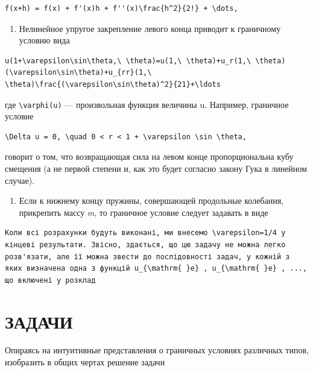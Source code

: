 \documentclass[
  ukrainian,
]{article}
\providecommand{\tightlist}{%
  \setlength{\itemsep}{0pt}\setlength{\parskip}{0pt}}
\begin{document}
\begin{verbatim}
f(x+h) = f(x) + f'(x)h + f''(x)\frac{h^2}{2!} + \dots,
\end{verbatim}

\begin{enumerate}
\def\labelenumi{\arabic{enumi}.}
\setcounter{enumi}{1}
\tightlist
\item
  Нелинейное упругое закрепление левого конца приводит к граничному
  условию вида
\end{enumerate}

\begin{verbatim}
u(1+\varepsilon\sin\theta,\ \theta)=u(1,\ \theta)+u_r(1,\ \theta)(\varepsilon\sin\theta)+u_{rr}(1,\ \theta)\frac{(\varepsilon\sin\theta)^2}{21}+\ldots
\end{verbatim}

где \texttt{\textbackslash{}varphi(u)} --- произвольная функция величины
u. Например, граничное условие

\begin{verbatim}
\Delta u = 0, \quad 0 < r < 1 + \varepsilon \sin \theta,
\end{verbatim}

говорит о том, что возвращающая сила на левом конце пропорциональна кубу
смещения (а не первой степени и, как это будет согласно закону Гука в
линейном случае).

\begin{enumerate}
\def\labelenumi{\arabic{enumi}.}
\setcounter{enumi}{2}
\tightlist
\item
  Если к нижнему концу пружины, совершающей продольные колебания,
  прикрепить массу \emph{m}, то граничное условие следует задавать в
  виде
\end{enumerate}

\begin{verbatim}
Коли всі розрахунки будуть виконані, ми внесемо \varepsilon=1/4 у кінцеві результати. Звісно, здається, що цю задачу не можна легко розв'язати, але її можна звести до послідовності задач, у кожній з яких визначена одна з функцій u_{\mathrm{ }e} , u_{\mathrm{ }e} , ..., що включені у розклад
\end{verbatim}

\section{ЗАДАЧИ}\label{ux437ux430ux434ux430ux447ux438-2}

Опираясь на интуитивные представления о граничных условиях различных
типов, изобразить в общих чертах решение задачи
\end{document}
